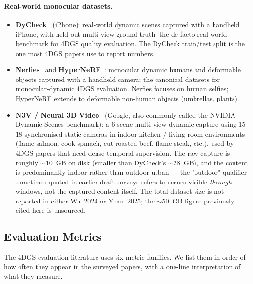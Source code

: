 \paragraph{Real-world monocular datasets.}
\begin{itemize}
  \item \textbf{DyCheck}~\cite{gao2022dycheck} (iPhone): real-world
        dynamic scenes captured with a handheld iPhone, with
        held-out multi-view ground truth; the de-facto real-world
        benchmark for 4DGS quality evaluation. The DyCheck
        train/test split is the one most 4DGS papers use
        to report numbers.
  \item \textbf{Nerfies}~\cite{park2021nerfies} and
        \textbf{HyperNeRF}~\cite{hypernerf2022}: monocular
        dynamic humans and deformable objects captured with a
        handheld camera; the canonical datasets for
        monocular-dynamic 4DGS evaluation. Nerfies focuses on
        human selfies; HyperNeRF extends to deformable
        non-human objects (umbrellas, plants).
  \item \textbf{N3V / Neural 3D Video}~\cite{li2022plenvdb} (Google,
        also commonly called the NVIDIA Dynamic Scenes
        benchmark): a 6-scene multi-view dynamic capture
        using 15--18 synchronised static cameras in indoor
        kitchen / living-room environments (flame salmon,
        cook spinach, cut roasted beef, flame steak, etc.),
        used by 4DGS papers that need dense temporal
        supervision. The raw capture is roughly
        $\sim$10~GB on disk (smaller than DyCheck's
        $\sim$28~GB), and the content is predominantly
        indoor rather than outdoor urban — the
        "outdoor" qualifier sometimes quoted in
        earlier-draft surveys refers to scenes visible
        \emph{through} windows, not the captured content
        itself. The total dataset size is not
        reported in either Wu~2024 or Yuan~2025; the
        $\sim$50~GB figure previously cited here is
        unsourced.
\end{itemize}

\subsection{Evaluation Metrics}
The 4DGS evaluation literature uses six metric families. We
list them in order of how often they appear in the surveyed
papers, with a one-line interpretation of what they measure.

